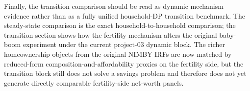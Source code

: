 \documentclass[11pt]{article}
\begin{document}
Finally, the transition comparison should be read as dynamic mechanism evidence rather than as a
fully unified household-DP transition benchmark. The steady-state comparison is the exact
household-to-household comparison; the transition section shows how the fertility mechanism alters
the original baby-boom experiment under the current project-03 dynamic block. The richer
homeownership objects from the original NIMBY IRFs are now matched by reduced-form
composition-and-affordability proxies on the fertility side, but the transition block still does
not solve a savings problem and therefore does not yet generate directly comparable fertility-side
net-worth panels.
\end{document}
